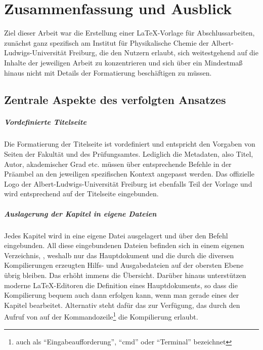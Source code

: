 %
%
%

\chapter{Zusammenfassung und Ausblick}
\label{ch:zusammenfassung_ausblick}

Ziel dieser Arbeit war die Erstellung einer \LaTeX{}-Vorlage für Abschlussarbeiten, zunächst ganz spezifisch am Institut für Physikalische Chemie der Albert-Ludwigs-Universität Freiburg, die den Nutzern erlaubt, sich weitestgehend auf die Inhalte der jeweiligen Arbeit zu konzentrieren und sich über ein Mindestmaß hinaus nicht mit Details der Formatierung beschäftigen zu müssen.


\section{Zentrale Aspekte des verfolgten Ansatzes}

\paragraph{Vordefinierte Titelseite}

Die Formatierung der Titelseite ist vordefiniert und entspricht den Vorgaben von Seiten der Fakultät und des Prüfungsamtes. Lediglich die Metadaten, also Titel, Autor, akademischer Grad etc. müssen über entsprechende Befehle in der Präambel an den jeweiligen spezifischen Kontext angepasst werden. Das offizielle Logo der Albert-Ludwigs-Universität Freiburg ist ebenfalls Teil der Vorlage und wird entsprechend auf der Titelseite eingebunden.


\paragraph{Auslagerung der Kapitel in eigene Dateien}

Jedes Kapitel wird in eine eigene Datei ausgelagert und über den Befehl  eingebunden. All diese eingebundenen Dateien befinden sich in einem eigenen Verzeichnis, , weshalb nur das Hauptdokument und die durch die diversen Kompilierungen erzeugten Hilfs- und Ausgabedateien auf der obersten Ebene übrig bleiben. Das erhöht immens die Übersicht. Darüber hinaus unterstützen moderne \LaTeX{}-Editoren die Definition eines Hauptdokuments, so dass die Kompilierung bequem auch dann erfolgen kann, wenn man gerade eines der Kapitel bearbeitet. Alternativ steht dafür das  zur Verfügung, das durch den Aufruf von  auf der Kommandozeile\footnote{auch als \enquote{Eingabeaufforderung}, \enquote{cmd} oder \enquote{Terminal} bezeichnet} die Kompilierung erlaubt.


